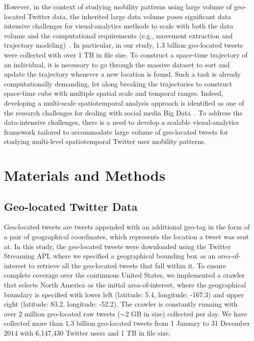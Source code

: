 \documentclass[ijgi,article,accept,moreauthors,pdftex,10pt,a4paper]{mdpi}
\theoremstyle{mdpi}
\newcounter{ex}
\newcounter{re}
\theoremstyle{mdpidefinition}
\begin{document}
However, in the context of studying mobility patterns using large volume of geo-located Twitter data, the inherited large data volume poses significant data intensive challenges for visual-analytics methods to scale with both the data volume and the computational requirements (e.g., movement extraction and trajectory modeling)~\cite{cao2014scalable}.
In particular, in our study, 1.3 billion geo-located tweets were collected with over 1 TB in file size.
To construct a space-time trajectory of an individual, it is necessary to go through the massive dataset to sort and update the trajectory whenever a new location is found.
Such a task is already computationally demanding, let along breaking the trajectories to construct space-time cube with multiple spatial scale and temporal ranges.
Indeed, developing a multi-scale spatiotemporal analysis approach is identified as one of the research challenges for dealing with social media Big Data~\cite{tsou2015}.
To address the data-intensive challenges, there is a need to develop a scalable visual-analytics framework tailored to accommodate large volume of geo-located tweets for studying multi-level spatiotemporal Twitter user mobility patterns.


\section{Materials and Methods}
\subsection{Geo-located Twitter Data}
Geo-located tweets are tweets appended with an additional geo-tag in the form of a pair of geographical coordinates, which represents the location a tweet was sent at.
In this study, the geo-located tweets were downloaded using the Twitter Streaming API, where we specified a geographical bounding box as an area-of-interest to retrieve all the geo-located tweets that fall within it.
To ensure complete coverage over the continuous United States, we implemented a crawler that selects North America as the initial area-of-interest, where the geographical boundary is specified with lower left (latitude: 5.4, longitude: -167.3) and upper right (latitude: 83.2, longitude: -52.2).
The crawler is constantly running with over 2 million geo-located raw tweets ($\sim$2 GB in size) collected per day.
We have collected more than 1.3 billion geo-located tweets from 1 January to 31 December 2014 with 6,147,430 Twitter users and 1 TB in file size.
\end{document}
